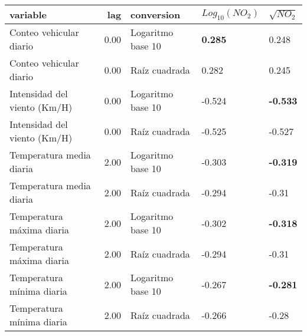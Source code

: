 \begin{table}[ht]
\centering
\begin{tabular}{lrlll}
  \hline
variable & lag & conversion & $Log_{10}(NO_{2})$ & $\sqrt{NO_{2}}$ \\ 
  \hline
Conteo vehicular diario & 0.00 & Logaritmo base 10 & \textbf{0.285} & 0.248 \\ 
  Conteo vehicular diario & 0.00 & Raíz cuadrada & 0.282 & 0.245 \\ 
  Intensidad del viento (Km/H) & 0.00 & Logaritmo base 10 & -0.524 & \textbf{-0.533} \\ 
  Intensidad del viento (Km/H) & 0.00 & Raíz cuadrada & -0.525 & -0.527 \\ 
  Temperatura media diaria & 2.00 & Logaritmo base 10 & -0.303 & \textbf{-0.319} \\ 
  Temperatura media diaria & 2.00 & Raíz cuadrada & -0.294 & -0.31 \\ 
  Temperatura máxima diaria & 2.00 & Logaritmo base 10 & -0.302 & \textbf{-0.318} \\ 
  Temperatura máxima diaria & 2.00 & Raíz cuadrada & -0.294 & -0.31 \\ 
  Temperatura mínima diaria & 2.00 & Logaritmo base 10 & -0.267 & \textbf{-0.281} \\ 
  Temperatura mínima diaria & 2.00 & Raíz cuadrada & -0.266 & -0.28 \\ 
   \hline
\end{tabular}
\end{table}

